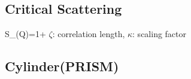 
\clearpage
\subsection{Critical Scattering}

\BE S_(Q)=1+ \EE $\zeta$:
correlation length, $\kappa$: scaling factor










\subsection{Cylinder(PRISM)}

